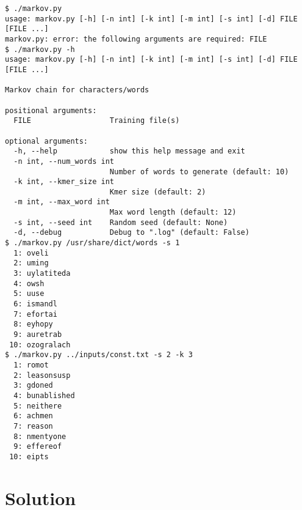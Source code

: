\documentclass[]{article}
\begin{document}
\begin{verbatim}
$ ./markov.py
usage: markov.py [-h] [-n int] [-k int] [-m int] [-s int] [-d] FILE [FILE ...]
markov.py: error: the following arguments are required: FILE
$ ./markov.py -h
usage: markov.py [-h] [-n int] [-k int] [-m int] [-s int] [-d] FILE [FILE ...]

Markov chain for characters/words

positional arguments:
  FILE                  Training file(s)

optional arguments:
  -h, --help            show this help message and exit
  -n int, --num_words int
                        Number of words to generate (default: 10)
  -k int, --kmer_size int
                        Kmer size (default: 2)
  -m int, --max_word int
                        Max word length (default: 12)
  -s int, --seed int    Random seed (default: None)
  -d, --debug           Debug to ".log" (default: False)
$ ./markov.py /usr/share/dict/words -s 1
  1: oveli
  2: uming
  3: uylatiteda
  4: owsh
  5: uuse
  6: ismandl
  7: efortai
  8: eyhopy
  9: auretrab
 10: ozogralach
$ ./markov.py ../inputs/const.txt -s 2 -k 3
  1: romot
  2: leasonsusp
  3: gdoned
  4: bunablished
  5: neithere
  6: achmen
  7: reason
  8: nmentyone
  9: effereof
 10: eipts
\end{verbatim}

\pagebreak

\hypertarget{solution-16}{%
\section{Solution}\label{solution-16}}
\end{document}
